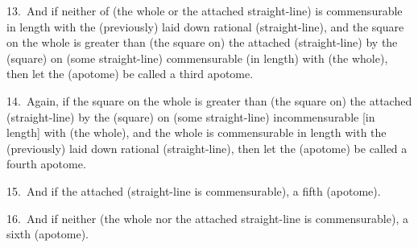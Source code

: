 \begin{Parallel}{}{}
{13.~And if neither of (the whole
or the attached straight-line) is commensurable
in length with the (previously) laid down rational (straight-line),
and the square on the whole is greater than (the
square on) the attached (straight-line) by the (square) on (some
straight-line) commensurable (in length) with (the whole), then let
the (apotome) be called a third apotome.

14.~Again, if the square
on the whole is greater than (the square on) the attached (straight-line) by the (square)
on (some straight-line) incommensurable [in length]  with (the whole), and the
whole is commensurable in length with the
(previously) laid down rational (straight-line), then let the (apotome) be
called a fourth apotome.

15.~And if the
attached (straight-line is commensurable),   a fifth (apotome).

16.~And if neither (the whole
nor the attached straight-line is commensurable), a sixth (apotome).}
\end{Parallel}

